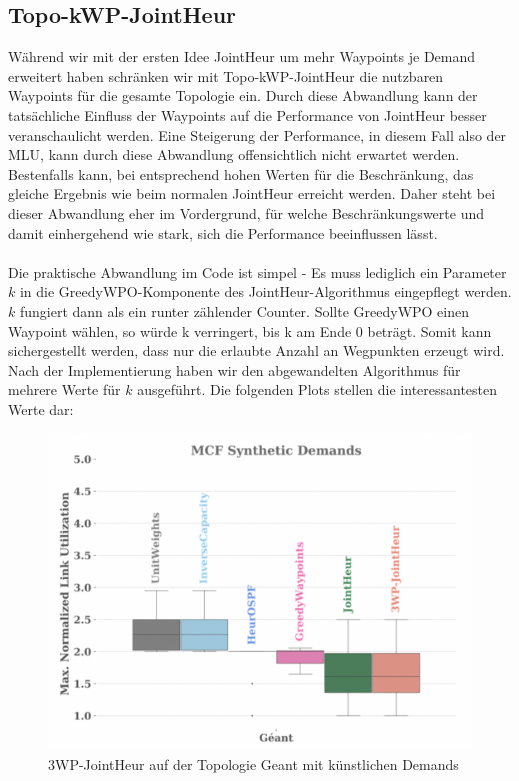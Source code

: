 \subsection{Topo-kWP-JointHeur}
Während wir mit der ersten Idee JointHeur um mehr Waypoints je Demand erweitert haben schränken wir mit Topo-kWP-JointHeur die nutzbaren Waypoints für die gesamte Topologie ein.
Durch diese Abwandlung kann der tatsächliche Einfluss der Waypoints auf die Performance von JointHeur besser veranschaulicht werden. Eine Steigerung der Performance, in diesem Fall also der MLU, kann durch diese Abwandlung offensichtlich nicht erwartet werden. 
Bestenfalls kann, bei entsprechend hohen Werten für die Beschränkung, das gleiche Ergebnis wie beim normalen JointHeur erreicht werden.
Daher steht bei dieser Abwandlung eher im Vordergrund, für welche Beschränkungswerte und damit einhergehend wie stark, sich die Performance beeinflussen lässt. \\
\\
Die praktische Abwandlung im Code ist simpel - Es muss lediglich ein Parameter $k$ in die 
GreedyWPO-Komponente des JointHeur-Algorithmus eingepflegt werden. $k$ fungiert dann als ein runter zählender Counter. Sollte GreedyWPO
einen Waypoint wählen, so würde k verringert, bis k am Ende 0 beträgt. Somit kann sichergestellt werden, dass nur die
erlaubte Anzahl an Wegpunkten erzeugt wird.
\\
Nach der Implementierung haben wir den abgewandelten Algorithmus für mehrere Werte für $k$ ausgeführt. Die folgenden Plots stellen die interessantesten Werte dar:
\begin{figure}[h]
  \centering
  \includegraphics[width=\linewidth]{abbildungen/syntDemtopokwp}
  \caption{3WP-JointHeur auf der Topologie Geant mit künstlichen Demands}
\end{figure}
